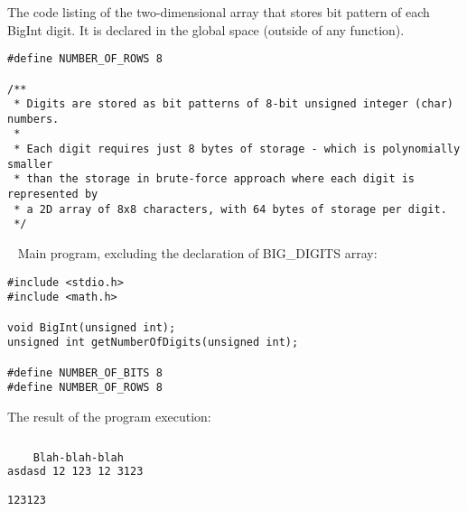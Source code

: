 \documentclass{article}
\begin{document}
	
	\noindent The code listing of the two-dimensional array that stores bit pattern of each BigInt digit. It is declared in the global space (outside of any function).
	
	\begin{verbatim}
#define NUMBER_OF_ROWS 8

/**
 * Digits are stored as bit patterns of 8-bit unsigned integer (char) numbers.
 *
 * Each digit requires just 8 bytes of storage - which is polynomially smaller
 * than the storage in brute-force approach where each digit is represented by
 * a 2D array of 8x8 characters, with 64 bytes of storage per digit.
 */
	\end{verbatim}
	
	\rmfamily\
	\newline
	\noindent Main program, excluding the declaration of BIG_DIGITS array:
	
	\begin{verbatim}
#include <stdio.h>
#include <math.h>

void BigInt(unsigned int);
unsigned int getNumberOfDigits(unsigned int);

#define NUMBER_OF_BITS 8
#define NUMBER_OF_ROWS 8
	\end{verbatim}
	
	
	\noindent The result of the program execution:
	
	\begin{lstlisting}[basicstyle=\fontsize{7}{9}\ttfamily, language=bash]%[basicstyle=\tiny, %or \small or \footnotesize etc.]
	
	Blah-blah-blah
asdasd 12 123 12 3123 

123123

	\end{lstlisting}
	
	
\paragraph{}\
\paragraph{}\
\paragraph{}\
\paragraph{}\
\end{document}
